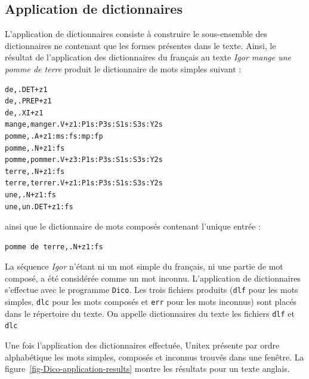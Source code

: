 \subsection{Application de dictionnaires}
\label{text-applying-dictionaries}
L’application de dictionnaires consiste à construire le sous-ensemble des dictionnaires
ne contenant que les formes présentes dans le texte. Ainsi, le résultat de l’application des
dictionnaires du français au texte \textit{Igor mange une pomme de terre} produit le dictionnaire de
mots simples suivant :

\bigskip
\begin{verbatim}
de,.DET+z1
de,.PREP+z1
de,.XI+z1
mange,manger.V+z1:P1s:P3s:S1s:S3s:Y2s
pomme,.A+z1:ms:fs:mp:fp
pomme,.N+z1:fs
pomme,pommer.V+z3:P1s:P3s:S1s:S3s:Y2s
terre,.N+z1:fs
terre,terrer.V+z1:P1s:P3s:S1s:S3s:Y2s
une,.N+z1:fs
une,un.DET+z1:fs
\end{verbatim}

\bigskip
\noindent ainsi que le dictionnaire de mots composés contenant l’unique entrée
:

\bigskip
\begin{verbatim}
pomme de terre,.N+z1:fs
\end{verbatim}

\bigskip
\noindent La séquence \textit{Igor} n'étant ni un mot simple du français, ni une partie de mot
composé, a été considérée comme un mot inconnu. L’application de dictionnaires
s’effectue avec le programme \verb+Dico+.
Les trois fichiers produits (\verb+dlf+ pour les mots simples, \verb+dlc+ pour les mots composés et
\verb+err+ pour les mots inconnus) sont placés dans le répertoire du texte. On appelle dictionnaires
du texte les fichiers \verb+dlf+ et \verb+dlc+

\bigskip
\noindent Une fois l’application des dictionnaires effectuée, Unitex présente par ordre alphabétique
les mots simples, composés et inconnus trouvés dans une fenêtre. La figure~\ref{fig-Dico-application-results} montre les résultats pour un texte anglais.


